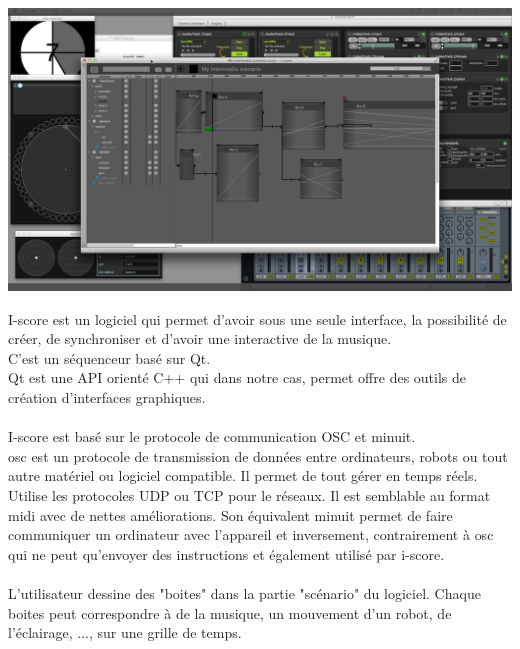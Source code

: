 \documentclass[10pt,a4paper]{report}
\begin{document}
\paragraph{}

\begin{center}
\includegraphics[scale=0.1]{image/iscore.jpg}
\end{center}

I-score est un logiciel qui permet d'avoir sous une seule interface, la possibilité de créer, de synchroniser et d'avoir une interactive de la musique.
\\
C'est un séquenceur basé sur Qt.\\
Qt est une API orienté C++ qui dans notre cas, permet offre des outils de création d'interfaces graphiques.
\paragraph{}
I-score est basé sur le protocole de communication OSC et minuit.
\\
\acrfull{osc} est un protocole de transmission de données entre ordinateurs, robots ou tout autre matériel ou logiciel compatible. Il permet de tout gérer en temps réels. Utilise les protocoles UDP ou TCP pour le réseaux. Il est semblable au format \acrfull{midi} avec de nettes améliorations. Son équivalent minuit permet de faire communiquer un ordinateur avec l'appareil et inversement, contrairement à \acrshort{osc} qui ne peut qu'envoyer des instructions et également utilisé par i-score.
\paragraph{}
L'utilisateur dessine des "boites" dans la partie "scénario" du logiciel. Chaque boites peut correspondre à de la musique, un mouvement d'un robot, de l'éclairage, ..., sur une grille de temps.
\end{document}
